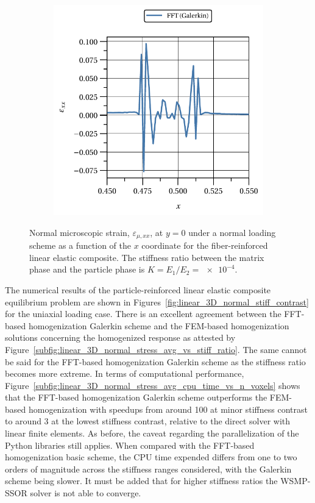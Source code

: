 \begin{figure}[hbt]
\begin{subfigure}[b]{0.49\textwidth}
      \includegraphics[width=\textwidth]{figures/linear_2D_ratio_-4_normal_strain_11_particle_2}
      \caption{}
      \label{subfig:linear_2D_ratio_-4_normal_strain_11_particle_2}
    \end{subfigure}
  \caption{Normal microscopic strain, \(\varepsilon_{\mu,xx}\), at \(y=0\) under a normal loading scheme as a function of the \(x\) coordinate for the fiber-reinforced linear elastic composite. The stiffness ratio between the matrix phase and the particle phase is \(K=E_1/E_2=\num{e-4}\).}
\label{fig:linear_2D_ratio_-4_normal_strain_11_particles}
\end{figure}

The numerical results of the particle-reinforced linear elastic composite equilibrium problem are shown in Figures~\ref{fig:linear_3D_normal_stiff_contrast} for the uniaxial loading case.
There is an excellent agreement between the FFT-based homogenization Galerkin scheme and the FEM-based homogenization solutions concerning the homogenized response as attested by Figure~\ref{subfig:linear_3D_normal_stress_avg_vs_stiff_ratio}.
The same cannot be said for the FFT-based homogenization Galerkin scheme as the stiffness ratio becomes more extreme.
In terms of computational performance, Figure~\ref{subfig:linear_3D_normal_stress_avg_cpu_time_vs_n_voxels} shows that the FFT-based homogenization Galerkin scheme outperforms the FEM-based homogenization with speedups from around 100 at minor stiffness contrast to around 3 at the lowest stiffness contrast, relative to the direct solver with linear finite elements.
As before, the caveat regarding the parallelization of the Python libraries still applies.
When compared with the FFT-based homogenization basic scheme, the CPU time expended differs from one to two orders of magnitude across the stiffness ranges considered, with the Galerkin scheme being slower.
It must be added that for higher stiffness ratios the WSMP-SSOR solver is not able to converge.


